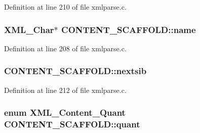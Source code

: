 Definition at line 210 of file xmlparse.\+c.

\subsubsection[{\texorpdfstring{name}{name}}]{ {\bf X\+M\+L\+\_\+\+Char}$\ast$ C\+O\+N\+T\+E\+N\+T\+\_\+\+S\+C\+A\+F\+F\+O\+L\+D\+::name}\hypertarget{struct_c_o_n_t_e_n_t___s_c_a_f_f_o_l_d_a976c830ed4559fd46e92d38abfdc576d}{}\label{struct_c_o_n_t_e_n_t___s_c_a_f_f_o_l_d_a976c830ed4559fd46e92d38abfdc576d}


Definition at line 208 of file xmlparse.\+c.

\subsubsection[{\texorpdfstring{nextsib}{nextsib}}]{ C\+O\+N\+T\+E\+N\+T\+\_\+\+S\+C\+A\+F\+F\+O\+L\+D\+::nextsib}\hypertarget{struct_c_o_n_t_e_n_t___s_c_a_f_f_o_l_d_a8958b88b6365b2c44bf651954971b067}{}\label{struct_c_o_n_t_e_n_t___s_c_a_f_f_o_l_d_a8958b88b6365b2c44bf651954971b067}


Definition at line 212 of file xmlparse.\+c.

\subsubsection[{\texorpdfstring{quant}{quant}}]{\setlength{\rightskip}{0pt plus 5cm}enum {\bf X\+M\+L\+\_\+\+Content\+\_\+\+Quant} C\+O\+N\+T\+E\+N\+T\+\_\+\+S\+C\+A\+F\+F\+O\+L\+D\+::quant}\hypertarget{struct_c_o_n_t_e_n_t___s_c_a_f_f_o_l_d_a0e9c84789f86e2e9f2b123179607cd98}{}\label{struct_c_o_n_t_e_n_t___s_c_a_f_f_o_l_d_a0e9c84789f86e2e9f2b123179607cd98}



